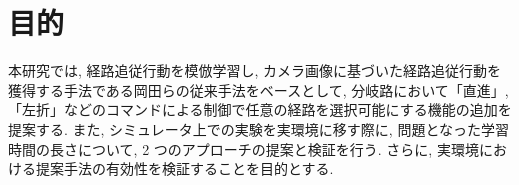 
\section{目的}
本研究では, 経路追従行動を模倣学習し, カメラ画像に基づいた経路追従行動を獲得する手法である岡田らの従来手法をベースとして, 分岐路において「直進」, 「左折」などのコマンドによる制御で任意の経路を選択可能にする機能の追加を提案する. また, シミュレータ上での実験を実環境に移す際に, 問題となった学習時間の長さについて, 2 つのアプローチの提案と検証を行う. さらに, 実環境における提案手法の有効性を検証することを目的とする.


